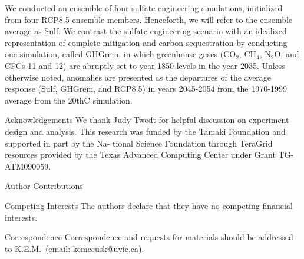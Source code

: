 \documentclass{nature}
\begin{document}
\begin{methods}
We conducted an ensemble of four sulfate engineering simulations, initialized from four RCP8.5 ensemble members. Henceforth, we will refer to the ensemble average as Sulf. We contrast the sulfate engineering scenario with an idealized representation of complete mitigation and carbon sequestration by conducting one simulation, called GHGrem, in which greenhouse gases (CO$_2$, CH$_4$, N$_2$O, and CFCs 11 and 12) are abruptly set to year 1850 levels in the year 2035. Unless otherwise noted, anomalies are presented as the departures of the average response (Sulf, GHGrem, and RCP8.5) in years 2045-2054 from the 1970-1999 average from the 20thC simulation.%

\end{methods}





%




\begin{addendum}
\item[Acknowledgements] We thank Judy Twedt for helpful discussion on experiment design and analysis. This research was funded by the Tamaki Foundation and supported in part by the Na- tional Science Foundation through TeraGrid resources provided by the Texas Advanced Computing Center under Grant TG-ATM090059.
\item[Author Contributions] 
 \item[Competing Interests] The authors declare that they have no competing financial interests.
\item[Correspondence] Correspondence and requests for materials should be addressed to K.E.M.~(email: kemccusk@uvic.ca).
\end{addendum}

\end{document}
